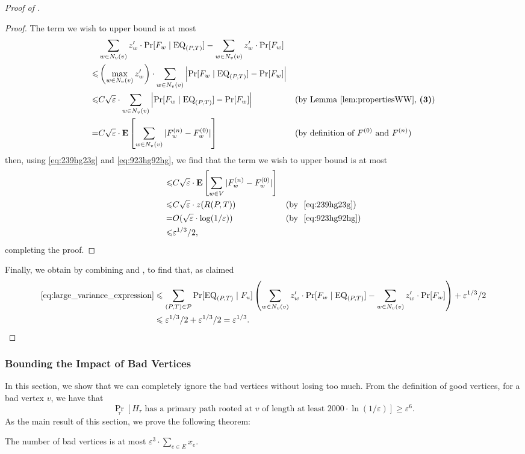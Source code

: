 \begin{proof}[Proof of ]
\begin{proof}
	The term we wish to upper bound is at most 
	\begin{align*}
		& \sum_{w\in N_v(v)} z'_w \cdot \Pr[F_w \mid \mathrm{EQ}_{(P,T)}] - \sum_{w\in N_v(v)} z'_w \cdot \Pr[F_w] && \\
		\leqslant & \left(\max_{w\in N_v(v)} z'_w\right)\cdot \sum_{w\in N_v(v)} \left|\Pr[F_w \mid \mathrm{EQ}_{(P,T)}] - \Pr[F_w]\right| && \\
		\leqslant & C\sqrt{\varepsilon}\cdot \sum_{w\in N_v(v)} \left|\Pr[F_w \mid \mathrm{EQ}_{(P,T)}] - \Pr[F_w]\right| && \text{(by Lemma~\ref{lem:propertiesWW}, {\bf (3)})}\\
		= & C\sqrt{\varepsilon}\cdot {\bf E}\left[ \sum_{w\in N_v(v)} |F^{(n)}_w-F^{(0)}_w|\right] && \text{(by definition of $F^{(0)}$ and $F^{(n)}$)}
	\end{align*}
	then, using \eqref{eq:239hg23g} and \eqref{eq:923hg92hg}, we find that the term we wish to upper bound is at most
	\begin{align*}
		\leqslant & C\sqrt{\varepsilon}\cdot {\bf E}\left[ \sum_{w\in V}|F^{(n)}_w-F^{(0)}_w|\right] && \\
		\leqslant & C\sqrt{\varepsilon}\cdot z(R(P,T)) && \text{(by ~\eqref{eq:239hg23g})}\\
		= & O(\sqrt{\varepsilon}\cdot \log(1/\varepsilon)) && \text{(by ~\eqref{eq:923hg92hg})} \\
		\leqslant  & \varepsilon^{1/3}/2,
	\end{align*}
	completing the proof.
\end{proof}
	Finally, we obtain  by combining  and , to find that, as claimed
		\begin{align*}
		\eqref{eq:large_variance_expression} & \leqslant 
		\sum_{(P,T)\in \mathcal{P}}\Pr[\mathrm{EQ}_{(P,T)} \mid F_u] \left(\sum_{w\in N_v(v)} z'_w \cdot \Pr[F_w \mid \mathrm{EQ}_{(P,T)}] - \sum_{w\in N_v(v)} z'_w \cdot \Pr[F_w] \right) + \varepsilon^{1/3}/2 \\
		& \leqslant \varepsilon^{1/3}/2 + \varepsilon^{1/3}/2 = \varepsilon^{1/3}. \qedhere
	\end{align*}
\end{proof}





\subsubsection{Bounding the Impact of Bad Vertices}
\label{sec:bad-is-ok}

In this section, we show that we can completely ignore the bad vertices without losing too much. 
From the definition of good vertices, for a bad vertex $v$, we have that 
$$\Pr_{\tau}[\mbox{$H_\tau$ has a primary path rooted at $v$ of length at least 
$2000 \cdot \ln(1/\varepsilon)$}] \geq \varepsilon^6.$$ 
As the main result of this section, we prove the following theorem:
\begin{thm}
  \label{lem:bad-is-ok}
  The number of bad vertices is at most $ \varepsilon^{3} \cdot \sum_{e \in E} x_{e}$.
\end{thm}


